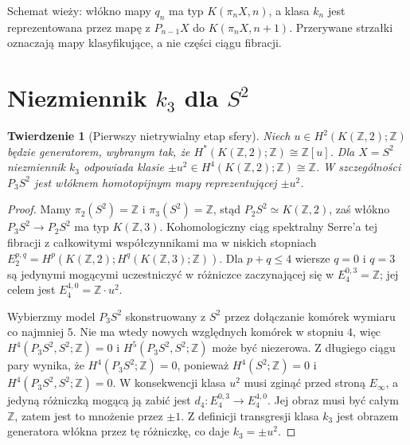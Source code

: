 \documentclass[11pt,a4paper,oneside]{report}
\newcommand{\Z}{\mathbb{Z}}
\theoremstyle{plain}
\newtheorem{twierdzenie}{Twierdzenie}[section]
\theoremstyle{definition}
\theoremstyle{remark}
\begin{document}
\begin{center}
\end{center}
\noindent Schemat wieży: włókno mapy $q_n$ ma typ $K(\pi_nX,n)$,
a klasa $k_n$ jest reprezentowana przez mapę z $P_{n-1}X$
do $K(\pi_nX,n+1)$. Przerywane strzałki oznaczają
mapy klasyfikujące, a nie części ciągu fibracji.

\section{Niezmiennik \texorpdfstring{$k_3$}{k3} dla \texorpdfstring{$S^2$}{S2}}
\begin{twierdzenie}[Pierwszy nietrywialny etap sfery]
\label{thm:s2-k-v7}
Niech $u\in H^2(K(\Z,2);\Z)$ będzie generatorem,
wybranym tak, że $H^*(K(\Z,2);\Z)\cong\Z[u]$.
Dla $X=S^2$ niezmiennik $k_3$ odpowiada klasie
$\pm u^2\in H^4(K(\Z,2);\Z)\cong\Z$.
W szczególności $P_3S^2$ jest włóknem homotopijnym
mapy reprezentującej $\pm u^2$.
\end{twierdzenie}
\begin{proof}
Mamy $\pi_2(S^2)=\Z$ i $\pi_3(S^2)=\Z$,
stąd $P_2S^2\simeq K(\Z,2)$, zaś włókno
$P_3S^2\to P_2S^2$ ma typ $K(\Z,3)$.
Kohomologiczny ciąg spektralny Serre'a tej fibracji
z całkowitymi współczynnikami ma w niskich stopniach
$E_2^{p,q}=H^p(K(\Z,2);H^q(K(\Z,3);\Z))$.
Dla $p+q\le4$ wiersze $q=0$ i $q=3$
są jedynymi mogącymi uczestniczyć w różniczce
zaczynającej się w $E_4^{0,3}=\Z$;
jej celem jest $E_4^{4,0}=\Z\cdot u^2$.

Wybierzmy model $P_3S^2$ skonstruowany z $S^2$
przez dołączanie komórek wymiaru co najmniej $5$.
Nie ma wtedy nowych względnych komórek w stopniu $4$,
więc
$H^4(P_3S^2,S^2;\Z)=0$ i
$H^5(P_3S^2,S^2;\Z)$ może być niezerowa.
Z długiego ciągu pary wynika, że
$H^4(P_3S^2;\Z)=0$, ponieważ
$H^4(S^2;\Z)=0$ i $H^4(P_3S^2,S^2;\Z)=0$.
W konsekwencji klasa $u^2$ musi zginąć przed
stroną $E_\infty$, a jedyną różniczką mogącą
ją zabić jest $d_4:E_4^{0,3}\to E_4^{4,0}$.
Jej obraz musi być całym $\Z$, zatem jest to
mnożenie przez $\pm1$. Z definicji transgresji
klasa $k_3$ jest obrazem generatora włókna
przez tę różniczkę, co daje $k_3=\pm u^2$.
\end{proof}
\end{document}
